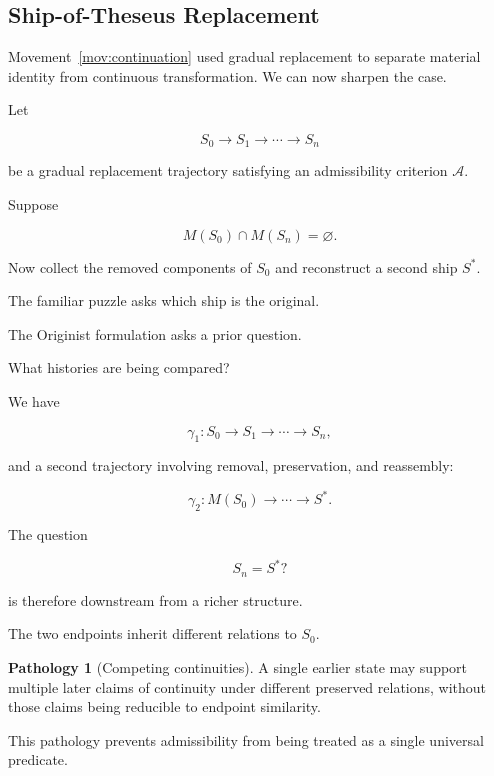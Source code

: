 \documentclass[
  11pt,
  a4paper,
  DIV=12,
  BCOR=0mm,
  parskip=half-
]{scrartcl}
\newcommand{\Adm}{\mathcal A}
\theoremstyle{definition}
\newtheorem{pathology}[definition]{Pathology}
\theoremstyle{plain}
\theoremstyle{remark}
\begin{document}

\subsection{Ship-of-Theseus Replacement}
\label{sec:theseus-pathology}

Movement~\ref{mov:continuation} used gradual replacement to separate material
identity from continuous transformation. We can now sharpen the case.

Let

\[
  S_0
  \to
  S_1
  \to
  \cdots
  \to
  S_n
\]

be a gradual replacement trajectory satisfying an admissibility criterion
\(\Adm\).

Suppose

\[
  M(S_0)\cap M(S_n)=\varnothing.
\]

Now collect the removed components of \(S_0\) and reconstruct a second ship
\(S^\ast\).

The familiar puzzle asks which ship is the original.

The Originist formulation asks a prior question.

What histories are being compared?

We have

\[
  \gamma_1:
  S_0\to S_1\to\cdots\to S_n,
\]

and a second trajectory involving removal, preservation, and reassembly:

\[
  \gamma_2:
  M(S_0)
  \to
  \cdots
  \to
  S^\ast.
\]

The question

\[
  S_n=S^\ast?
\]

is therefore downstream from a richer structure.

The two endpoints inherit different relations to \(S_0\).

\begin{pathology}[Competing continuities]
\label{path:competing-continuities}
A single earlier state may support multiple later claims of continuity under
different preserved relations, without those claims being reducible to
endpoint similarity.
\end{pathology}

This pathology prevents admissibility from being treated as a single universal
predicate.
\end{document}
